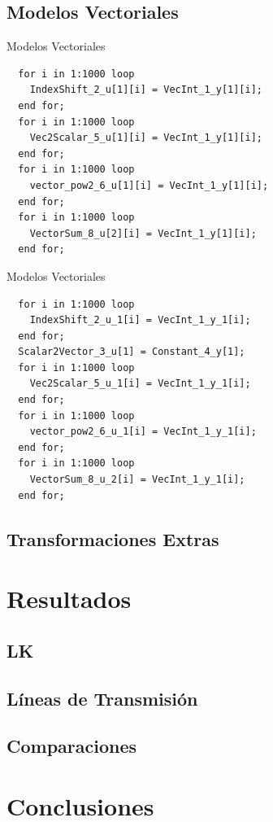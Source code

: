 \documentclass[10pt,handout]{beamer}
\begin{document}
	\subsection{Modelos Vectoriales}
\begin{frame}[fragile]{Modelos Vectoriales}
\begin{verbatim}
  for i in 1:1000 loop
    IndexShift_2_u[1][i] = VecInt_1_y[1][i];
  end for;
  for i in 1:1000 loop
    Vec2Scalar_5_u[1][i] = VecInt_1_y[1][i];
  end for;
  for i in 1:1000 loop
    vector_pow2_6_u[1][i] = VecInt_1_y[1][i];
  end for;
  for i in 1:1000 loop
    VectorSum_8_u[2][i] = VecInt_1_y[1][i];
  end for;
\end{verbatim}
\end{frame}

\begin{frame}[fragile]{Modelos Vectoriales}
\begin{verbatim}
  for i in 1:1000 loop
    IndexShift_2_u_1[i] = VecInt_1_y_1[i];
  end for;
  Scalar2Vector_3_u[1] = Constant_4_y[1];
  for i in 1:1000 loop
    Vec2Scalar_5_u_1[i] = VecInt_1_y_1[i];
  end for;
  for i in 1:1000 loop
    vector_pow2_6_u_1[i] = VecInt_1_y_1[i];
  end for;
  for i in 1:1000 loop
    VectorSum_8_u_2[i] = VecInt_1_y_1[i];
  end for;
\end{verbatim}
\end{frame}


	\subsection{Transformaciones Extras}
\section{Resultados}
	\subsection{LK}
	\subsection{Líneas de Transmisión}
	\subsection{Comparaciones}
\section{Conclusiones}
\end{document}
